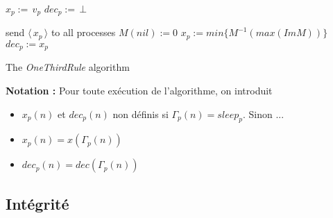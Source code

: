 \documentclass{article}
\begin{document}
\begin{algorithm}[htb]
\begin{distribalgo}[1]
\BLANK {}
  \STATE $x_p :=\, v_p$ 
  \STATE $dec_p :=\, \bot$ 

\ENDINDENT \BLANK

    \STATE send $\langle\, x_p\, \rangle$ to all processes
  \ENDINDENT
  \BLANK
	\STATE $M(nil) := 0$ 
	  \STATE $x_p := min \{M^{-1} (max (Im M))\}$ 
		  \STATE $dec_p := x_p$ 
        \ENDIF
      \ENDIF
  \ENDINDENT
\ENDINDENT \BLANK


\caption{The {\em OneThirdRule} algorithm} \label{algo:R}
\end{distribalgo}

\end{algorithm}

\textbf{Notation :} Pour toute exécution de l'algorithme, on introduit
\begin{itemize}

	\item $x_p(n)$ et $dec_p(n)$ non définis si $\Gamma_p(n) = sleep_p$. Sinon ...
	\item $x_p(n) = x(\Gamma_p(n))$
	\item $dec_p(n) = dec(\Gamma_p(n))$

\end{itemize}

\subsection{Intégrité}
\end{document}
